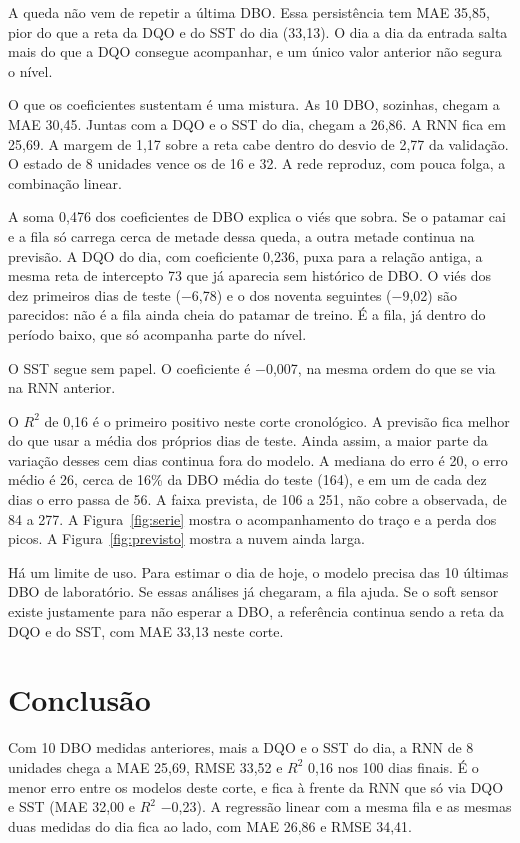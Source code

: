 \documentclass[11pt,a4paper]{article}
\begin{document}
A queda não vem de repetir a última DBO. Essa persistência tem MAE 35,85, pior do que a reta da DQO e do SST do dia (33,13). O dia a dia da entrada salta mais do que a DQO consegue acompanhar, e um único valor anterior não segura o nível.

O que os coeficientes sustentam é uma mistura. As 10 DBO, sozinhas, chegam a MAE 30,45. Juntas com a DQO e o SST do dia, chegam a 26,86. A RNN fica em 25,69. A margem de 1,17 sobre a reta cabe dentro do desvio de 2,77 da validação. O estado de 8 unidades vence os de 16 e 32. A rede reproduz, com pouca folga, a combinação linear.

A soma 0,476 dos coeficientes de DBO explica o viés que sobra. Se o patamar cai e a fila só carrega cerca de metade dessa queda, a outra metade continua na previsão. A DQO do dia, com coeficiente 0,236, puxa para a relação antiga, a mesma reta de intercepto 73 que já aparecia sem histórico de DBO. O viés dos dez primeiros dias de teste ($-$6,78) e o dos noventa seguintes ($-$9,02) são parecidos: não é a fila ainda cheia do patamar de treino. É a fila, já dentro do período baixo, que só acompanha parte do nível.

O SST segue sem papel. O coeficiente é $-$0,007, na mesma ordem do que se via na RNN anterior.

O \(R^{2}\) de 0,16 é o primeiro positivo neste corte cronológico. A previsão fica melhor do que usar a média dos próprios dias de teste. Ainda assim, a maior parte da variação desses cem dias continua fora do modelo. A mediana do erro é 20, o erro médio é 26, cerca de 16\% da DBO média do teste (164), e em um de cada dez dias o erro passa de 56. A faixa prevista, de 106 a 251, não cobre a observada, de 84 a 277. A Figura~\ref{fig:serie} mostra o acompanhamento do traço e a perda dos picos. A Figura~\ref{fig:previsto} mostra a nuvem ainda larga.

Há um limite de uso. Para estimar o dia de hoje, o modelo precisa das 10 últimas DBO de laboratório. Se essas análises já chegaram, a fila ajuda. Se o soft sensor existe justamente para não esperar a DBO, a referência continua sendo a reta da DQO e do SST, com MAE 33,13 neste corte.

\section{Conclusão}

Com 10 DBO medidas anteriores, mais a DQO e o SST do dia, a RNN de 8 unidades chega a MAE 25,69, RMSE 33,52 e \(R^{2}\) 0,16 nos 100 dias finais. É o menor erro entre os modelos deste corte, e fica à frente da RNN que só via DQO e SST (MAE 32,00 e \(R^{2}\) $-$0,23). A regressão linear com a mesma fila e as mesmas duas medidas do dia fica ao lado, com MAE 26,86 e RMSE 34,41.
\end{document}
